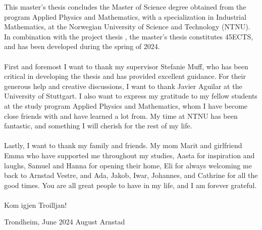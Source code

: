 This master's thesis concludes the Master of Science degree obtained from the program Applied Physics and Mathematics, with a specialization in Industrial Mathematics, at the Norwegian University of Science and Technology (NTNU). In combination with the project thesis \citep{Arnstad:Relative_variable_importance_in_Bayesian_linear_mixed_models:2024}, the master's thesis constitutes 45ECTS, and has been developed during the spring of 2024.
\\
\\
First and foremost I want to thank my supervisor Stefanie Muff, who has been critical in developing the thesis and has provided excellent guidance. For their generous help and creative discussions, I want to thank Javier Aguilar at the University of Stuttgart. I also want to express my gratitude to my fellow students at the study program Applied Physics and Mathematics, whom I have become close friends with and have learned a lot from. My time at NTNU has been fantastic, and something I will cherish for the rest of my life. 
\\
\\
Lastly, I want to thank my family and friends. My mom Marit and girlfriend Emma who have supported me throughout my studies, Aasta for inspiration and laughs, Samuel and Hanna for opening their home, Eli for always welcoming me back to Arnstad Vestre, and Ada, Jakob, Iwar, Johannes, and Cathrine for all the good times. You are all great people to have in my life, and I am forever grateful. 
\\
\\
Kom igjen Troilljan!
\vspace*{\fill}
\begin{flushleft}
    Trondheim, June 2024 \hfill August Arnstad
\end{flushleft}